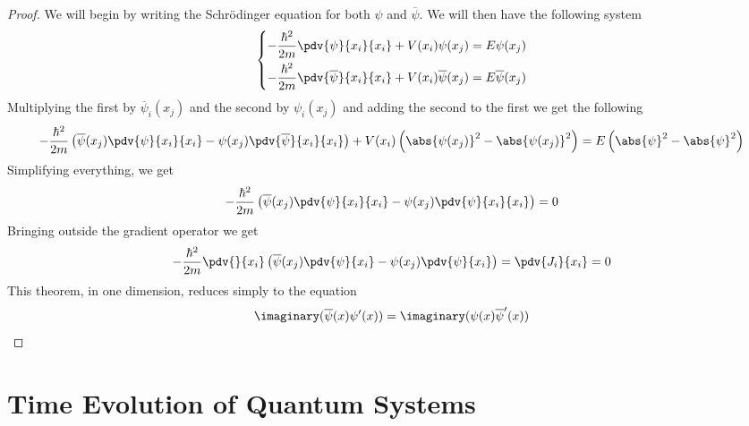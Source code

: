 \documentclass[a4paper, 11pt]{book}
\newcommand{\1}{\opr{\mathds{1}}}
\theoremstyle{plain}
\begin{document}
	\begin{proof}
		We will begin by writing the Schrödinger equation for both $\psi$ and $\overline{\psi}$. We will then have the following system
		\begin{equation*}
			\left\{\begin{aligned}
					-\frac{\hbar^2}{2m}\pdv{\psi}{x_i}{x_i}+V(x_i)\psi(x_j)&=E\psi(x_j)\\
					-\frac{\hbar^2}{2m}\pdv{\overline{\psi}}{x_i}{x_i}+V(x_i)\overline{\psi}(x_j)&=E\overline{\psi}(x_j)
			\end{aligned}\right.
		\end{equation*}
		Multiplying the first by $\overline{\psi}_i(x_j)$ and the second by $\psi_i(x_j)$ and adding the second to the first we get the following
		\begin{equation*}
			-\frac{\hbar^2}{2m}\left( \overline{\psi}(x_j)\pdv{\psi}{x_i}{x_i}-\psi(x_j)\pdv{\overline{\psi}}{x_i}{x_i} \right)+V(x_i)\left(\abs{\psi(x_j)}^2-\abs{\psi(x_j)}^2\right)=E\left( \abs{\psi}^2-\abs{\psi}^2 \right)
		\end{equation*}
		Simplifying everything, we get
		\begin{equation*}
			-\frac{\hbar^2}{2m}\left( \overline{\psi}(x_j)\pdv{\psi}{x_i}{x_i}-\psi(x_j)\pdv{\psi}{x_i}{x_i} \right)=0
		\end{equation*}
		Bringing outside the gradient operator we get
		\begin{equation*}
			-\frac{\hbar^2}{2m}\pdv{}{x_i}\left( \overline{\psi}(x_j)\pdv{\psi}{x_i}-\psi(x_j)\pdv{\psi}{x_i} \right)=\pdv{J_i}{x_i}=0
		\end{equation*}
		This theorem, in one dimension, reduces simply to the equation
		\begin{equation*}
			\imaginary(\overline{\psi}(x)\psi'(x))=\imaginary(\psi(x)\overline{\psi}'(x))
		\end{equation*}
	\end{proof}
	\section{Time Evolution of Quantum Systems}
\end{document}
